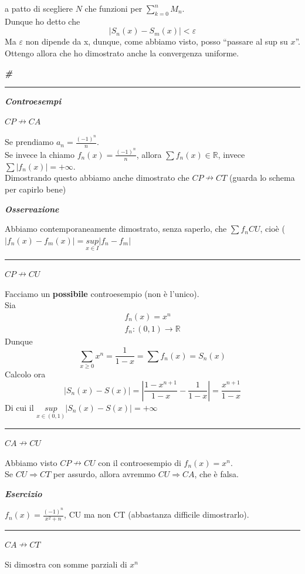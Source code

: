 \documentclass{article}
\theoremstyle{definition}
\newcommand{\linea}{\vspace{15pt}\hrule\vspace{15pt}}
\newcommand{\R}{\mathbb{R}}
\newcommand{\cvd}{\begin{center} \textbf{\textit{\#}} \end{center}}
\newcommand{\virgolette}[1]{``#1''}
\begin{document}
a patto di scegliere $N$ che funzioni per $\sum_{k=0}^n M_n$.
\\
Dunque ho detto che
\begin{equation}
    |S_n(x)-S_m(x)| < \varepsilon
\end{equation}
Ma $\varepsilon$ non dipende da x, dunque, come abbiamo visto, posso \virgolette{passare al sup su $x$}.
\\
Ottengo allora che ho dimostrato anche la convergenza uniforme.
\\
\cvd
\newpage
\linea
\begin{center}
    \textbf{\textit{Controesempi}}
\end{center}
\begin{center}
    $CP \nrightarrow CA$
\end{center}
Se prendiamo $a_n=\frac{(-1)^n}{n}$.
\\
Se invece la chiamo $f_n(x)=\frac{(-1)^n}{n}$, allora $\sum f_n(x) \in \R$, invece $\sum |f_n(x)| = +\infty$.
\\
Dimostrando questo abbiamo anche dimostrato che $CP \nrightarrow CT$ (guarda lo schema per capirlo bene)

\begin{center}
    \textbf{\textit{Osservazione}}
\end{center}
Abbiamo contemporaneamente dimostrato, senza saperlo, che $\sum f_n CU$, cioè ($|f_n(x)-f_m(x)| = \underset{x \in I}{sup}|f_n-f_m|$
\linea
\begin{center}
    $CP \nrightarrow CU$
\end{center}
Facciamo un \textbf{possibile} controesempio (non è l'unico).
\\
Sia 
\begin{align}
    f_n(x)= x^n
    \\
    f_n: (0,1) \to \R
\end{align}
Dunque
\begin{equation}
    \sum_{x \geqslant 0} x^n =\frac{1}{1-x}=\sum f_n(x) = S_n(x)
\end{equation}
Calcolo ora
\begin{equation}
    \left|S_n(x)-S(x)\right|=\left|\frac{1-x^{n+1}}{1-x}-\frac{1}{1-x}\right|=\frac{x^{n+1}}{1-x}
\end{equation}
Di cui il $\underset{x \in (0,1)}{sup}|S_n(x)-S(x)|=+\infty$
\linea
\begin{center}
    $CA \nrightarrow CU$
\end{center}
Abbiamo visto $CP \nrightarrow CU$ con il controesempio di $f_n(x)=x^n$.
\\
Se $CU \Longrightarrow CT$ per assurdo, allora avremmo $CU \Longrightarrow CA$, che è falsa.
\begin{center}
    \textbf{\textit{Esercizio}}
\end{center}
$f_n(x)=\frac{(-1)^n}{x^2+n}$, CU ma non CT (abbastanza difficile dimostrarlo).
\linea
\begin{center}
    $CA \nrightarrow CT$
\end{center}
Si dimostra con somme parziali di $x^n$
\end{document}
